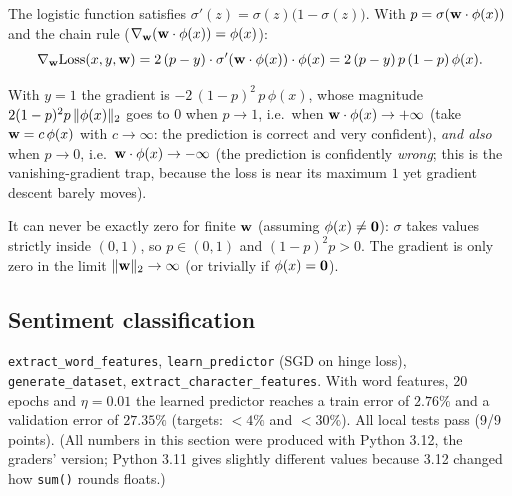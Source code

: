 \begin{solution}
The logistic function satisfies $\sigma'(z)=\sigma(z)\bigl(1-\sigma(z)\bigr)$. With $p=\sigma(\mathbf{w}\cdot\phi(x))$
and the chain rule ($\nabla_{\mathbf{w}}(\mathbf{w}\cdot\phi(x))=\phi(x)$):
\[
\nabla_{\mathbf{w}}\text{Loss}(x,y,\mathbf{w})=2\,(p-y)\cdot\sigma'(\mathbf{w}\cdot\phi(x))\cdot\phi(x)
=2\,(p-y)\,p\,(1-p)\,\phi(x).
\]
\end{solution}

\begin{solution}
With $y=1$ the gradient is $-2\,(1-p)^2\,p\,\phi(x)$, whose magnitude $2(1-p)^2p\,\| \phi(x)\|_{2}$ goes to $0$
when $p\to1$, i.e.\ when $\mathbf{w}\cdot\phi(x)\to+\infty$ (take $\mathbf{w}=c\,\phi(x)$ with $c\to\infty$: the
prediction is correct and very confident), \emph{and also} when $p\to0$, i.e.\ $\mathbf{w}\cdot\phi(x)\to-\infty$
(the prediction is confidently \emph{wrong}; this is the vanishing-gradient trap, because the loss is near
its maximum $1$ yet gradient descent barely moves).

It can never be exactly zero for finite $\mathbf{w}$ (assuming $\phi(x)\neq\mathbf{0}$): $\sigma$ takes values
strictly inside $(0,1)$, so $p\in(0,1)$ and $(1-p)^2p>0$. The gradient is only zero in the limit
$\| \mathbf{w}\|_{2}\to\infty$ (or trivially if $\phi(x)=\mathbf{0}$).
\end{solution}

\subsection{Sentiment classification}
\texttt{extract\_word\_features}, \texttt{learn\_predictor} (SGD on hinge loss), \texttt{generate\_dataset},
\texttt{extract\_character\_features}. With word features, 20 epochs and $\eta=0.01$ the learned predictor
reaches a train error of $2.76\%$ and a validation error of $27.35\%$ (targets: $<4\%$ and $<30\%$). All local
tests pass (9/9 points). (All numbers in this section were produced with Python 3.12, the graders' version;
Python 3.11 gives slightly different values because 3.12 changed how \texttt{sum()} rounds floats.)

